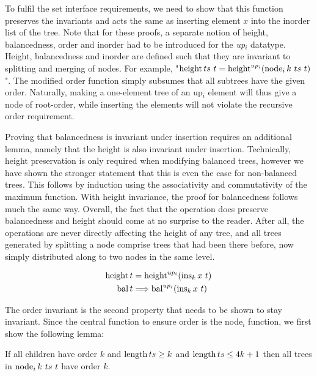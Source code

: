 To fulfil the set interface requirements,
we need to show that this function preserves the invariants
and acts the same as inserting element $x$ into the inorder list of the tree.
Note that for these proofs, a separate notion of height, balancedness, order
and inorder had to be introduced for the \textit{up}$_i$ datatype.
Height, balancedness and inorder are
defined such that they are invariant to splitting and merging of nodes.
For example, "$\height ts\ t = \height^{up_i} (\node_i k\ ts\ t)$".
The modified order function simply subsumes that all subtrees have
the given order.
Naturally, making a one-element tree of an up$_i$ element will thus
give a node of root-order, while inserting the elements
will not violate the recursive order requirement.

Proving that balancedness is invariant 
under insertion requires an additional lemma,
namely that the height is also invariant under insertion.
Technically, height preservation is only required when modifying balanced
trees, however we have shown the stronger statement that this is even the case for non-balanced trees.
This follows by induction using the
associativity and commutativity of the maximum function.
With height invariance, the proof for balancedness follows much the same way.
Overall, the fact that the operation does preserve balancedness and
height should come at no surprise to the reader.
After all, the operations are never directly affecting the height of any tree,
and all trees generated by splitting a node comprise trees
that had been there before, now simply distributed along to two nodes
in the same level.

\begin{lemma}
    \begin{align*}
    \operatorname{height} t & = \operatorname{height}^{up_i} (\operatorname{ins}_k x\ t) \\
    \operatorname{bal} t & \Longrightarrow \operatorname{bal}^{up_i} (\operatorname{ins}_k x\ t)
    \end{align*}
\end{lemma}

The order invariant is the second property that needs
to be shown to stay invariant.
Since the central function to ensure order is the node$_i$ function,
we first show the following lemma:

\begin{lemma}
\label{lem:nodei-order}
    If all children have order $k$ and $\operatorname{length} ts \ge k$ and $\operatorname{length} ts \le 4k+1$
    then all trees in $\operatorname{node}_i k\ ts\ t$ have order $k$.
\end{lemma}

